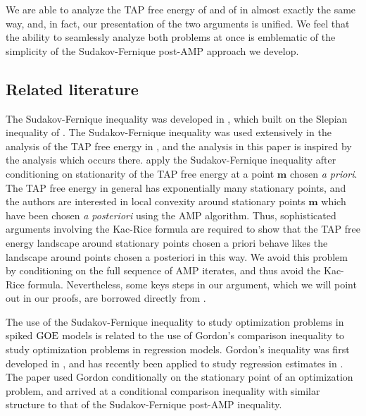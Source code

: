 \documentclass[]{article}
\def\GOE{{\rm GOE}}
\def\bbm{{\boldsymbol m}}
\begin{document}
\begin{enumerate}
    We are able to analyze the TAP free energy of \cite{celentanoFanMei2021} and of \cite{AlaouiMontanariSelke2022} in almost exactly the same way,
    and, in fact, our presentation of the two arguments is unified. 
    We feel that the ability to seamlessly analyze both problems at once is emblematic of the simplicity of the Sudakov-Fernique post-AMP approach we develop.

\end{enumerate}

\subsection{Related literature}
\label{sec:lit}

The Sudakov-Fernique inequality was developed in \cite{sudakov1971gaussian,sudakov1979geometric, fernique1975regularite},
which built on the Slepian inequality of \cite{slepian1962}.
The Sudakov-Fernique inequality was used extensively in the analysis of the TAP free energy in \cite{celentanoFanMei2021},
and the analysis in this paper is inspired by the analysis which occurs there. 
\cite{celentanoFanMei2021} apply the Sudakov-Fernique inequality after conditioning on stationarity of the TAP free energy at a point $\bbm$ chosen \emph{a priori}.
The TAP free energy in general has exponentially many stationary points,
and the authors are interested in local convexity around stationary points $\bbm$ which have been chosen \emph{a posteriori} using the AMP algorithm.
Thus, sophisticated arguments involving the Kac-Rice formula are required to show that the TAP free energy landscape around stationary points chosen a priori behave likes the landscape around points chosen a posteriori in this way. 
We avoid this problem by conditioning on the full sequence of AMP iterates, and thus avoid the Kac-Rice formula. 
Nevertheless, some keys steps in our argument, which we will point out in our proofs, are borrowed directly from \cite{celentanoFanMei2021}.

The use of the Sudakov-Fernique inequality to study optimization problems in spiked $\GOE$ models is related to the use of Gordon's comparison inequality to study optimization problems in regression models.
Gordon's inequality was first developed in \cite{Gordon1985,gordon1988},
and has recently been applied to study regression estimates in \cite{stojnic2013,thrampoulidis2015a,thrampoulidis2015b,miolane2021,celentanoMontanari2021}.
The paper \cite{celentanoMontanari2021} used Gordon conditionally on the stationary point of an optimization problem, and arrived at a conditional comparison inequality with similar structure to that of the Sudakov-Fernique post-AMP inequality.
\end{document}
